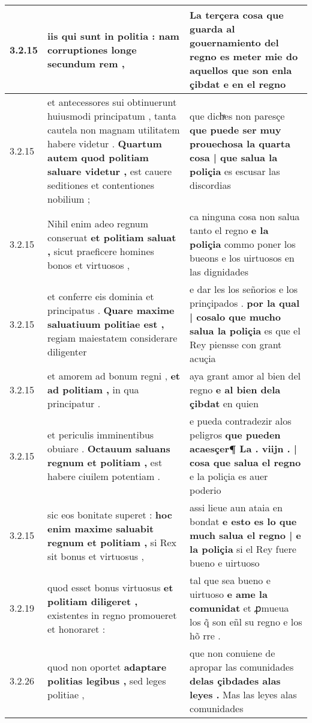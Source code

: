 \begin{tabular}{|p{1cm}|p{6.5cm}|p{6.5cm}|}
3.2.15 & iis \textbf{ qui sunt in politia : } nam corruptiones longe secundum rem , & La terçera cosa que guarda al gouernamiento del regno es meter mie \textbf{ do aquellos que son enla çibdat } e en el regno \\\hline
3.2.15 & et antecessores sui obtinuerunt huiusmodi principatum , tanta cautela non magnam utilitatem habere videtur . \textbf{ Quartum autem quod politiam saluare videtur , } est cauere seditiones et contentiones nobilium ; & que dichͣes non paresçe \textbf{ que puede ser muy prouechosa la quarta cosa | que salua la poliçia } es escusar las discordias \\\hline
3.2.15 & Nihil enim adeo regnum conseruat \textbf{ et politiam saluat , } sicut praeficere homines bonos et virtuosos , & ca ninguna cosa non salua tanto el regno \textbf{ e la poliçia } commo poner los bueons e los uirtuosos en las dignidades \\\hline
3.2.15 & et conferre eis dominia et principatus . \textbf{ Quare maxime saluatiuum politiae est , } regiam maiestatem considerare diligenter & e dar les los señorios e los prinçipados . \textbf{ por la qual | cosalo que mucho salua la poliçia } es que el Rey piensse con grant acuçia \\\hline
3.2.15 & et amorem ad bonum regni , \textbf{ et ad politiam , } in qua principatur . & aya grant amor al bien del regno \textbf{ e al bien dela çibdat } en quien \\\hline
3.2.15 & et periculis imminentibus obuiare . \textbf{ Octauum saluans regnum et politiam , } est habere ciuilem potentiam . & e pueda contradezir alos peligros \textbf{ que pueden acaesçer¶ La . viijn . | cosa que salua el regno } e la poliçia es auer poderio \\\hline
3.2.15 & sic eos bonitate superet : \textbf{ hoc enim maxime saluabit regnum et politiam , } si Rex sit bonus et virtuosus , & assi lieue aun ataia en bondat \textbf{ e esto es lo que much salua el regno | e la poliçia } si el Rey fuere bueno e uirtuoso \\\hline
3.2.19 & quod esset bonus virtuosus \textbf{ et politiam diligeret , } existentes in regno promoueret et honoraret : & tal que sea bueno e uirtuoso \textbf{ e ame la comunidat } et ꝓmueua los q̃ son eñl su regno e los hõ rre . \\\hline
3.2.26 & quod non oportet \textbf{ adaptare politias legibus , } sed leges politiae , & que non conuiene de apropar las comunidades \textbf{ delas çibdades alas leyes . } Mas las leyes alas comunidades \\\hline

\end{tabular}
